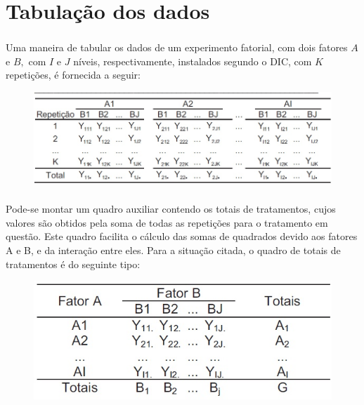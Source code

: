 \documentclass[14pt,aspectratio=1610]{beamer}
\begin{document}
\section{Tabulação dos dados}
\begin{frame}{}
\frametitle{}
\begin{block}{}
\justifying
Uma maneira de tabular os dados de um experimento fatorial, com dois fatores
$A$ e $B,$ com $I$ e $J$ níveis, respectivamente, instalados segundo o DIC, com $K$
repetições, é fornecida a seguir:
\begin{figure}[H]
    \centering
    \includegraphics[scale=0.5]{Figuras/Tabulacao}
  \end{figure}
\end{block}
\end{frame}

\begin{frame}{}
\frametitle{}
\begin{block}{}
\justifying
Pode-se montar um quadro auxiliar contendo os totais de tratamentos,
cujos valores são obtidos pela soma de todas as repetições para o tratamento
em questão. Este quadro facilita o cálculo das somas de quadrados devido aos
fatores A e B, e da interação entre eles. Para a situação citada, o quadro de
totais de tratamentos é do seguinte tipo:
\begin{figure}[H]
    \centering
    \includegraphics[scale=0.5]{Figuras/Tabulacao2}
  \end{figure}
\end{block}
\end{frame}
\end{document}
